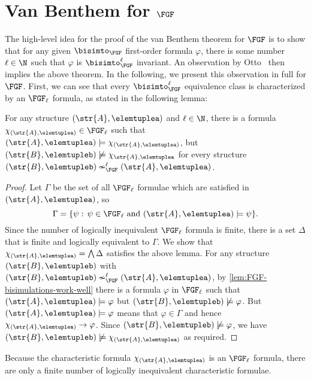 \section{Van Benthem for $\FGF$}\label{sec:van-benthem-theorem}
The high-level idea for the proof of the van Benthem theorem for $\FGF$ is to show that for any given $\bisimto_{\FGF}$ first-order formula $\varphi$, there is some number $\ell \in \N$ such that $\varphi$ is $\bisimto_{\FGF}^{\ell}$ invariant.
An observation by Otto~\cite[Obs.~13]{Otto04} then implies the above theorem.
In the following, we present this observation in full for $\FGF$.
First, we can see that every $\bisimto_{\FGF}^{\ell}$ equivalence class is characterized by an $\FGF_{\ell}$ formula, as stated in the following lemma:
\begin{lemma}
  For any structure $(\str{A}, \elemtuplea)$ and $\ell \in \N$, there is a formula $\chi_{(\str{A}, \elemtuplea)} \in \FGF_{\ell}$ such that $(\str{A}, \elemtuplea) \models \chi_{(\str{A}, \elemtuplea)}$, but $(\str{B}, \elemtupleb) \not\models \chi_{\str{A}, \elemtuplea}$ for every structure $(\str{B}, \elemtupleb) \nsim^{\ell}_{\FGF} (\str{A}, \elemtuplea)$.
\end{lemma}
\begin{proof}
  Let $\Gamma$  be the set of all $\FGF_{\ell}$ formulae which are satisfied in $(\str{A}, \elemtuplea)$, so
  \begin{equation*}
    \Gamma = \{ \psi:\, \psi \in \FGF_{\ell} \text{ and } (\str{A}, \elemtuplea) \models \psi \}.
  \end{equation*}
  Since the number of logically inequivalent $\FGF_{\ell}$ formula is finite, there is a set $\Delta$ that is finite and logically equivalent to $\Gamma$.
  We show that $\chi_{(\str{A}, \elemtuplea)} = \bigwedge \Delta$ satisfies the above lemma.
  For any structure $(\str{B}, \elemtupleb)$ with $(\str{B}, \elemtupleb) \nsim_{\FGF}^{\ell} (\str{A}, \elemtuplea)$, by \cref{lem:FGF-bisimulations-work-well} there is a formula $\varphi$ in $\FGF_{\ell}$ such that $(\str{A}, \elemtuplea) \models \varphi$ but $(\str{B}, \elemtupleb) \not\models \varphi$.
  But $(\str{A}, \elemtuplea) \models \varphi$ means that $\varphi \in \Gamma$ and hence $\chi_{(\str{A},\elemtuplea)} \to \varphi$.
  Since $(\str{B}, \elemtupleb) \not\models \varphi$, we have $(\str{B}, \elemtupleb) \not\models \chi_{(\str{A}, \elemtuplea)}$ as required.
\end{proof}
Because the characteristic formula $\chi_{(\str{A}, \elemtuplea)}$ is an $\FGF_{\ell}$ formula, there are only a finite number of logically inequivalent characteristic formulae.
